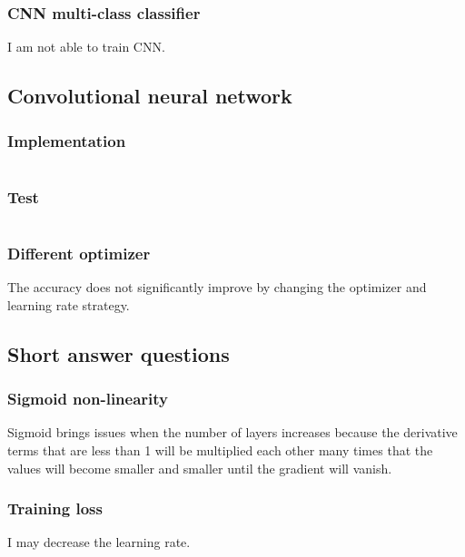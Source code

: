 \documentclass[12pt]{article}
\begin{document}
\subsubsection{CNN multi-class classifier}
I am not able to train CNN.

\newpage
\subsection{Convolutional neural network}
\subsubsection{Implementation}
\begin{scriptsize}
\inputminted[frame=single,framesep=10pt,linenos, breaklines,xleftmargin=\parindent,xrightmargin=\parindent]{python}{./Homework1/code/vgg.py}
\end{scriptsize}

\newpage
\subsubsection{Test}
\inputminted[frame=single,framesep=10pt,linenos, breaklines,xleftmargin=\parindent,xrightmargin=\parindent]{python}{./Homework1/code/vgg.out}
\subsubsection{Different optimizer}
The accuracy does not significantly improve by changing the optimizer and learning rate strategy.


\newpage
\subsection{Short answer questions}

\subsubsection{Sigmoid non-linearity}
Sigmoid brings issues when the number of layers increases because the derivative terms that are less than 1 will be multiplied each other many times that the values will become smaller and smaller until the gradient will vanish.

\subsubsection{Training loss}
I may decrease the learning rate.
\end{document}

